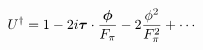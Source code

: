 \begin{equation}
U^\dag= 1- 2i \mbox{\boldmath$\tau$}\cdot\frac{\mbox{\boldmath$\phi$}}{F_\pi} - 2\frac{\phi^2}{F_\pi^2} +\cdots
\end{equation}

